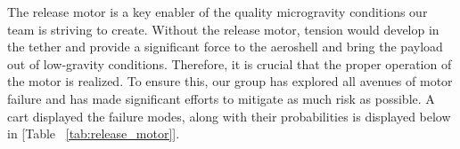 \indent\indent The release motor is a key enabler of the quality microgravity conditions our team is striving to create. Without the release motor, tension would develop in the tether and provide a significant force to the aeroshell and bring the payload out of low-gravity conditions. Therefore, it is crucial that the proper operation of the motor is realized. To ensure this, our group has explored all avenues of motor failure and has made significant efforts to mitigate as much risk as possible. A cart displayed the failure modes, along with their probabilities is displayed below in [Table ~\ref{tab:release_motor}]. 

\begin{table}[H]
\caption{\label{tab:release_motor} Release Motor Failure Modes \& Probabilities}
\centering

\end{table}

